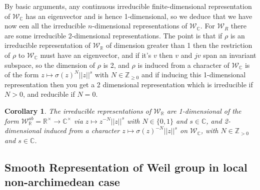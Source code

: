 \documentclass[12pt,a4paper,english]{article}
\theoremstyle{definition}
\theoremstyle{plain}
\newtheorem{coro}{Corollary}
\begin{document}
By basic arguments, any continuous irreducible finite-dimensional representation of $\mathcal{W}_{\mathbb{C}}$ has an eigenvector and is hence 1-dimensional, so we deduce that we have now een all the irreducible $n$-dimensional representations of $\mathcal{W}_{\mathbb{C}}$. For $\mathcal{W}_{R}$ there are some irreducible 2-dimensional representations. The point is that if $\rho $ is an irreducible representation of $\mathcal{W}_{\mathbb{R}}$ of dimension greater than 1 then the restriction of $\rho$ to $\mathcal{W}_{\mathbb{C}}$ must have an eigenvector, and if it's $v$ then $v$ and $jv$ span an invariant subspace, so the dimension of $\rho$ is 2, and $\rho$ is induced from a character of $\mathcal{W}_{\mathbb{C}}$ is of the form $z\mapsto\sigma(z)^{N}||z||^{s}$ with $N\in\mathbb{Z}_{\geq0}$ and if inducing this 1-dimensional representation then you get a 2 dimensional representation which is irreducible if $N>0$, and reducible if $N=0$.
\begin{coro}
The irreducible representations of $\mathcal{W}_{\mathbb{R}}$ are 1-dimensional of the form    $\mathcal{W}^{ab}_{\mathbb{R}}=\mathbb{R}^{\times}\rightarrow\mathbb{C}^{\times}$ via $z\mapsto z^{-N}||z||^{s}$ with $N\in\{0,1\}$ and $s\in\mathbb{C}$, and 2-dimensional induced from a character $z\mapsto\sigma(z)^{-N}||z||^{s}$ on $\mathcal{W}_{\mathbb{C}}$, with $N\in \mathbb{Z}_{>0}$ and $s\in\mathbb{C}$.
\end{coro}

\subsection{Smooth Representation of Weil group in local non-archimedean case}
\end{document}
